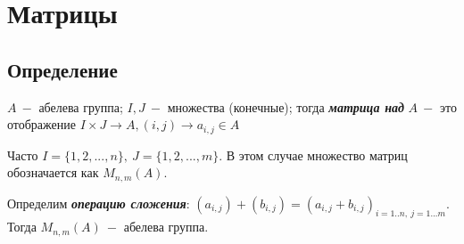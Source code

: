 \section{Матрицы}
\subsection{Определение}

\begin{definition}
    $A\ -$ абелева группа; $I,J\ -$ множества (конечные); тогда 
\textbf{\textit{матрица над}} $A\ -$ это отображение $I\times J\rightarrow 
A, (i,j)\rightarrow a_{i,j}\in A$
\end{definition}

\begin{designation}
    Часто $I=\{1,2,...,n\},\ J=\{1,2,...,m\}$. В этом случае множество 
матриц обозначается как $M_{n,m}(A)$.
\end{designation}

\begin{definition}
    Определим \textbf{\textit{операцию сложения}}: 
$(a_{i,j})+(b_{i,j})=(a_{i,j}+b_{i,j})_{i=1..n,\  j=1...m}$. Тогда 
$M_{n,m}(A)\ -$ абелева группа.    
\end{definition}

